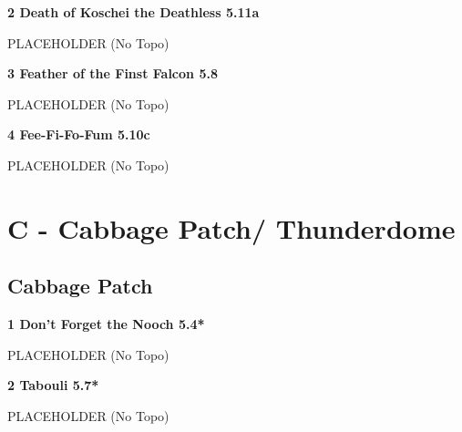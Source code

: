 \begin{multicols}{2}
\needspace{1.5cm}
\label{rt:Death of Koschei the Deathless}
\colorbox{RoyalBlue!20}{
\parbox{0.95\linewidth}{
\textbf{
2 Death of Koschei the Deathless 5.11a  
}}}

\begin{adjustwidth}{0.5cm}{}			
PLACEHOLDER (No Topo)
\end{adjustwidth}



\needspace{1.5cm}
\label{rt:Feather of the Finst Falcon}
\colorbox{green!20}{
\parbox{0.95\linewidth}{
\textbf{
3 Feather of the Finst Falcon 5.8  
}}}

\begin{adjustwidth}{0.5cm}{}			
PLACEHOLDER (No Topo)
\end{adjustwidth}



\needspace{1.5cm}
\label{rt:Fee-Fi-Fo-Fum}
\colorbox{RoyalBlue!20}{
\parbox{0.95\linewidth}{
\textbf{
4 Fee-Fi-Fo-Fum 5.10c  
}}}

\begin{adjustwidth}{0.5cm}{}			
PLACEHOLDER (No Topo)
\end{adjustwidth}




\newpage

\section{C - Cabbage Patch/ Thunderdome}\label{sa:Cabbage Patch/ Thunderdome}




\needspace{1.5cm}
\subsection*{Cabbage Patch}\label{bf:Cabbage Patch}
	


\needspace{1.5cm}
\label{rt:Don't Forget the Nooch}
\colorbox{green!20}{
\parbox{0.95\linewidth}{
\textbf{
1 Don't Forget the Nooch 5.4*  
}}}

\begin{adjustwidth}{0.5cm}{}			
PLACEHOLDER (No Topo)
\end{adjustwidth}



\needspace{1.5cm}
\label{rt:Tabouli}
\colorbox{green!20}{
\parbox{0.95\linewidth}{
\textbf{
2 Tabouli 5.7*  
}}}

\begin{adjustwidth}{0.5cm}{}			
PLACEHOLDER (No Topo)
\end{adjustwidth}




\end{multicols}
